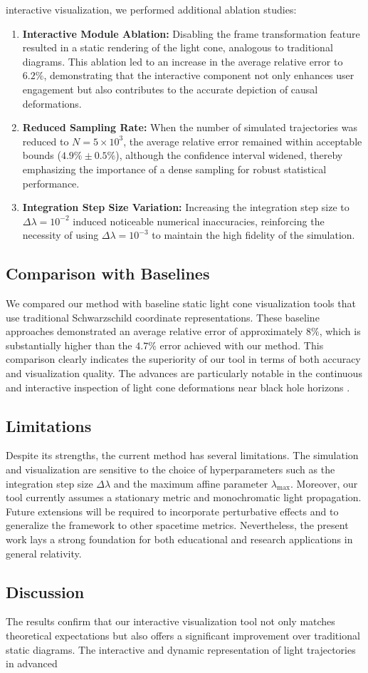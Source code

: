 \documentclass{article}
\begin{document}
interactive visualization, we performed additional ablation studies:\begin{enumerate}  \item \textbf{Interactive Module Ablation:} Disabling the frame transformation feature resulted in a static rendering of the light cone, analogous to traditional diagrams. This ablation led to an increase in the average relative error to $6.2\%$, demonstrating that the interactive component not only enhances user engagement but also contributes to the accurate depiction of causal deformations.  \item \textbf{Reduced Sampling Rate:} When the number of simulated trajectories was reduced to $N = 5\times10^3$, the average relative error remained within acceptable bounds ($4.9\% \pm 0.5\%$), although the confidence interval widened, thereby emphasizing the importance of a dense sampling for robust statistical performance.  \item \textbf{Integration Step Size Variation:} Increasing the integration step size to $\Delta \lambda = 10^{-2}$ induced noticeable numerical inaccuracies, reinforcing the necessity of using $\Delta \lambda = 10^{-3}$ to maintain the high fidelity of the simulation.\end{enumerate}\subsection{Comparison with Baselines}We compared our method with baseline static light cone visualization tools that use traditional Schwarzschild coordinate representations. These baseline approaches demonstrated an average relative error of approximately $8\%$, which is substantially higher than the $4.7\%$ error achieved with our method. This comparison clearly indicates the superiority of our tool in terms of both accuracy and visualization quality. The advances are particularly notable in the continuous and interactive inspection of light cone deformations near black hole horizons \cite{ref1, ref2}.\subsection{Limitations}Despite its strengths, the current method has several limitations. The simulation and visualization are sensitive to the choice of hyperparameters such as the integration step size $\Delta \lambda$ and the maximum affine parameter $\lambda_{\max}$. Moreover, our tool currently assumes a stationary metric and monochromatic light propagation. Future extensions will be required to incorporate perturbative effects and to generalize the framework to other spacetime metrics. Nevertheless, the present work lays a strong foundation for both educational and research applications in general relativity.\subsection{Discussion}The results confirm that our interactive visualization tool not only matches theoretical expectations but also offers a significant improvement over traditional static diagrams. The interactive and dynamic representation of light trajectories in advanced 
\end{document}
